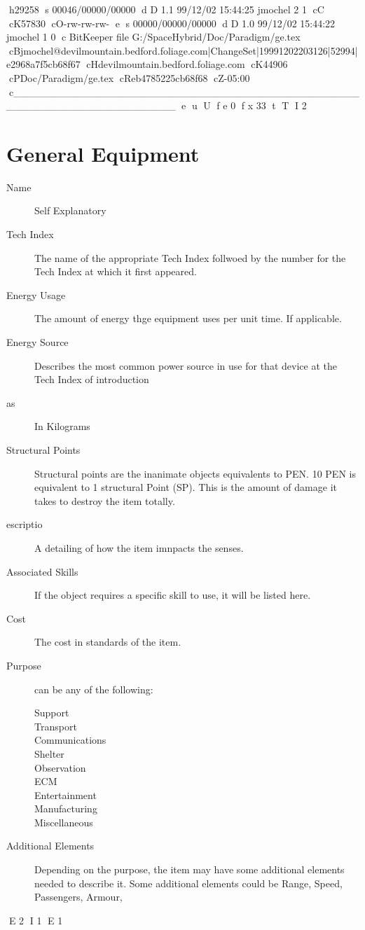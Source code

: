 h29258
s 00046/00000/00000
d D 1.1 99/12/02 15:44:25 jmochel 2 1
cC
cK57830
cO-rw-rw-rw-
e
s 00000/00000/00000
d D 1.0 99/12/02 15:44:22 jmochel 1 0
c BitKeeper file G:/SpaceHybrid/Doc/Paradigm/ge.tex
cBjmochel@devilmountain.bedford.foliage.com|ChangeSet|19991202203126|52994|e2968a7f5cb68f67
cHdevilmountain.bedford.foliage.com
cK44906
cPDoc/Paradigm/ge.tex
cReb4785225cb68f68
cZ-05:00
c______________________________________________________________________
e
u
U
f e 0
f x 33
t
T
I 2
\chapter{General Equipment}

\begin{description}
	\item[Name]
	Self Explanatory
	\item[Tech Index]
	The name of the appropriate Tech Index follwoed by the number for 
	the Tech Index at which it first appeared.
	\item[Energy Usage]
	The amount of energy thge equipment uses per unit time. If 
	applicable.
	\item[Energy Source]
	Describes the most common power source in use for that device at 
	the Tech Index of introduction
	\item[as]
	In Kilograms
	\item[Structural Points]
	Structural points are the in\-ani\-mate ob\-jects equivalents to PEN. 
	10 PEN is equivalent to 1 structural Point (SP). This is the amount 
	of damage it takes to destroy the item totally.
	\item[escriptio]
	A detailing of how the item imnpacts the senses.
	\item[Associated Skills ]
	If the object requires a specific skill to use, it will be listed 
	here.                 
	\item[Cost]
	The cost in standards of the item. 
	\item[Purpose]
	can be any of the following:
	\begin{description}
		\item[Support]
		\item[Transport]
		\item[Communications]
		\item[Shelter]
		\item[Observation]
		\item[ECM]
		\item[Entertainment]
		\item[Manufacturing]
		\item[Miscellaneous]
	\end{description}
	\item[Additional Elements]
	Depending on the pur\-pose, the item may have some additional elements 
	needed to describe it. Some additional elements could be Range, Speed, Passengers, Armour, 
\end{description}


E 2
I 1
E 1
